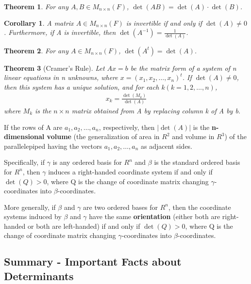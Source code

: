 \documentclass{article}
\newcommand{\bd}[1]{\textbf{#1}}
\theoremstyle{plain}
\newtheorem{theorem}{Theorem}[section]
\newtheorem*{corollary}{Corollary}
\theoremstyle{plain} %
\begin{document}
\begin{theorem}
  For any $A, B \in M_{n\times n}(F)$, $\det(AB) = \det(A)\cdot \det(B)$.
\end{theorem}

\begin{corollary}
  A matrix $A \in M_{n\times n}(F)$ is invertible if and only if $\det(A) \neq  0$. Furthermore, if A is invertible, then $\det(A^{-1}) = \frac{1}{\det(A)}$.
\end{corollary}

\begin{theorem}
  For any $A \in M_{n\times n}(F)$, $\det(A^t) = \det(A)$.
\end{theorem}

\begin{theorem}[Cramer's Rule]
  Let $Ax = b$ be the matrix form of a system of n linear equations in n unknowns, where $x = (x_1, x_2,\ldots,x_n)^t$. If $\det(A) \neq 0$, then this system has a unique solution, and for each $k (k =1, 2,\ldots,n)$,
  \begin{align*}
    x_k=\frac{\det(M_k)}{\det (A)}
  \end{align*}
  where $M_k$ is the $n \times n$ matrix obtained from A by replacing column k of A by b.
\end{theorem}

If the rows of A are $a_1, a_2,\ldots,a_n$, respectively, then $\lvert \det(A)\rvert$ is the \bd{n-dimensional volume} (the generalization of area in $R^2$ and volume in $R^3$) of the parallelepiped having the vectors $a_1, a_2,\ldots,a_n$ as adjacent sides.

Specifically, if $\gamma$ is any ordered basis for $R^n$ and $\beta$ is the standard ordered basis for $R^n$, then $\gamma$ induces a right-handed coordinate system if and only if $\det(Q) > 0$, where Q is the change of coordinate matrix changing $\gamma$-coordinates into $\beta$-coordinates.

More generally, if $\beta$ and $\gamma$ are two ordered bases for $R^n$, then the coordinate systems induced by $\beta$ and $\gamma$ have the same \bd{orientation} (either both are right-handed or both are left-handed) if and only if $\det(Q) > 0$, where Q is the change of coordinate matrix changing $\gamma$-coordinates into $\beta$-coordinates.

\subsection{Summary - Important Facts about Determinants}
\end{document}
